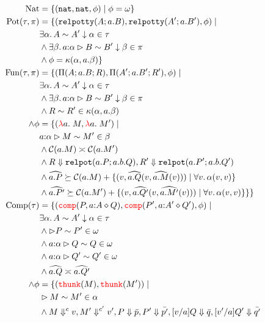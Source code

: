 \begin{align*}
  \text{Nat} &= \{(\nat,\nat,\phi) \mid \phi = \omega\}\\
  \text{Pot}(\tau,\pi) &= 
    \{(\relpotty{A}{a}{B}, \relpotty{A'}{a}{B'}, \phi) \mid &\\
    &\exists \alpha.\, \sameType{A}{A'}{\alpha}{\tau} \\
    &\land\exists \beta.\, \sameTypeOne{a}{\alpha}{B}{B'}{\beta}{\pi} \\
    &\land \phi = \kappa(\alpha,a.\beta)
    \}\\
  \text{Fun}(\tau, \pi) &=
  \{(\arrabt{A}{a.B}{R}, \arrabt{A'}{a.B'}{R'}, \phi) 
  \mid & \\
  &\exists \alpha.\, \sameType{A}{A'}{\alpha}{\tau} \\
  &\land\exists \beta.\, \sameTypeOne{a}{\alpha}{B}{B'}{\beta}{\pi} \\
  &\land R \sim R' \in \kappa(\alpha, a.\beta)\\
  \land\phi &= \{(\lam{a}{\_}{M}, \lam{a}{}{M'}) \mid \\
  &\sameComp{\isOf{a}{\alpha}}{M}{M'}{\beta}\\
  &\land \fequiv{\cost{a.M}}{\cost{a.M'}}\\
  &\land \eval{R}{\relpot{a}{P}{a.b}{Q}}, \eval{R'}{\relpot{a}{P'}{a.b}{Q'}}\\
  &\land \widehat{a.P} \succeq \cost{a.M} + \{(v, \widehat{a.Q}(v,\widehat{a.M}(v))) \mid \forall v.\, \alpha(v,v)\}\\
  &\land \widehat{a.P'} \succeq \cost{a.M'} + \{(v, \widehat{a.Q'}(v,\widehat{a.M'}(v))) \mid \forall v.\, \alpha(v,v)\}
   \}
  \}\\
  \text{Comp}(\tau) &= \{
  (\ccomp{P}{\isOf{a}{A}}{Q}, \ccomp{P'}{\isOf{a}{A'}}{Q'}, \phi) \mid \\
  &\exists \alpha.\, \sameType{A}{A'}{\alpha}{\tau}\\
  &\land \sameComp{}{P}{P'}{\omega}\\ 
  &\land \sameComp{\isOf{a}{\alpha}}{Q}{Q}{\omega}\\
  &\land \sameComp{\isOf{a}{\alpha}}{Q'}{Q'}{\omega}\\
  &\land \fequiv{\widehat{a.Q}}{\widehat{a.Q'}}\\
  \land\phi &= \{(\thunk{M}, \thunk{M'}) \mid \\
  &\sameComp{}{M}{M'}{\alpha}\\
  &\land \evalCost{M}{c}{v}, \evalCost{M'}{c'}{v'}, \eval{P}{\bar{p}},  
    \eval{P'}{\bar{p'}}, \eval{[v/a]Q}{\bar{q}}, \eval{[v'/a]Q'}{\bar{q'}}\\

\end{align*}
